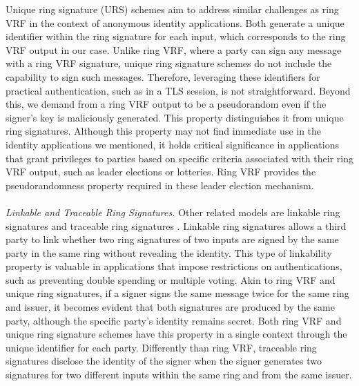 Unique ring signature (URS) schemes \cite{URCframework} aim to address similar challenges as ring VRF in the context of anonymous identity applications. Both generate a unique identifier within the ring signature for each input, which corresponds to the ring VRF output in our case. Unlike ring VRF, where a party can sign any message with a ring VRF signature, unique ring signature schemes do not include the capability to sign such messages. Therefore, leveraging these identifiers for practical authentication, such as in a TLS session, is not straightforward. 
Beyond this, we demand from a ring VRF output  to be a pseudorandom even if the signer's key is maliciously generated. This property distinguishes it from unique ring signatures. 
Although this property may not find immediate use in the identity applications we mentioned, it holds critical significance in applications that grant privileges to parties based on specific criteria associated with their ring VRF output, such as leader elections or lotteries. 
Ring VRF provides the pseudorandomness property required in these leader election mechanism.
\\\\
\noindent\textit{Linkable and Traceable Ring Signatures.} Other related models are linkable ring signatures \cite{ring_linkable,ring_linkablee} and traceable ring signatures \cite{traceable07,traceable_sub}. Linkable ring signatures allows a third party to link whether two ring signatures of two inputs are signed by the same party in the same ring without revealing the identity. This type of linkability property is valuable in applications that impose restrictions on authentications, such as preventing double spending or multiple voting. Akin to ring VRF and unique ring signatures, if a signer signs the same message twice for the same ring and issuer, it becomes evident that both signatures are produced by the same party, although the specific party's identity remains secret.  Both ring VRF and unique ring signature schemes have this property in a single context through the unique identifier for each party.
Differently than ring VRF, traceable ring signatures  disclose the identity of the signer when the signer generates two signatures for two different inputs within the same ring and from the same issuer.
